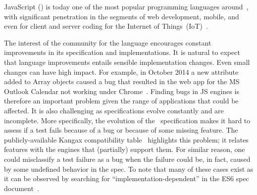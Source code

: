 \documentclass[10pt,conference,anonymous]{IEEEtran}
\begin{document}
JavaScript (\js{}) is today one of the most popular programming
languages around~\cite{business-insider,stackify}, with significant
penetration in the segments of web development, mobile, and even for
client and server coding for the Internet of
Things~(IoT)~\cite{simply-technologies}.

The interest of the community for the language encourages constant
improvements in its specification and implementations.  It is natural
to expect that language improvements entails sensible implementation
changes. Even small changes can have high impact. For example, in
October 2014 a new attribute added to Array objects caused a bug that
resulted in the web app for the MS Outlook Calendar not working under
Chrome~\cite{array-bug-chromium-issue4247,array-bug-discussion}. Finding
bugs in JS engines is therefore an important problem given the range
of applications that could be affected. It is also challenging as
specifications evolve constantly and are incomplete. More
specifically, the evolution of the \js\ specification makes it hard to
assess if a test fails because of a bug or because of some missing
feature. The publicly-available Kangax compatibility
table~\cite{kangax} highlights this problem; it relates features with
the engines that (partially) support them. For similar reason, one
could misclassify a test failure as a bug when the failure could be,
in fact, caused by some undefined behavior in the spec. To note that
many of these cases exist as it can be observed by searching for
``implementation-dependent'' in the ES6 spec
document~\cite{ecmas262-spec}.
\end{document}
